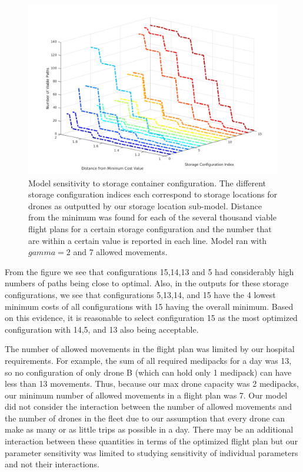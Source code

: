 \documentclass[twocolumn,10pt]{asme2ej}
\begin{document}
\begin{figure}
	\centering
	\includegraphics[width=1.1\linewidth]{../cost_output_per_storage}
	\caption[Fig 2]{Model sensitivity to storage container configuration. The different storage configuration indices each correspond to storage locations for drones as outputted by our storage location sub-model. Distance from the minimum was found for each of the several thousand viable flight plans for a certain storage configuration and the number that are within a certain value is reported in each line. Model ran with $gamma=2$ and 7 allowed movements.}
	\label{Fig 3}
\end{figure}
From the figure we see that configurations 15,14,13 and 5 had considerably high numbers of paths being close to optimal. Also, in the outputs for these storage configurations, we see that configurations 5,13,14, and 15 have the 4 lowest minimum costs of all configurations with 15 having the overall minimum. Based on this evidence, it is reasonable to select configuration 15 as the most optimized configuration with 14,5, and 13 also being acceptable.

The number of allowed movements in the flight plan was limited by our hospital requirements. For example, the sum of all required medipacks for a day was 13, so no configuration of only drone B (which can hold only 1 medipack) can have less than 13 movements. Thus, because our max drone capacity was 2 medipacks, our minimum number of allowed movements in a flight plan was 7. Our model did not consider the interaction between the number of allowed movements and the number of drones in the fleet due to our assumption that every drone can make as many or as little trips as possible in a day. There may be an additional interaction between these quantities in terms of the optimized flight plan but our parameter sensitivity was limited to studying sensitivity of individual parameters and not their interactions.
\end{document}
